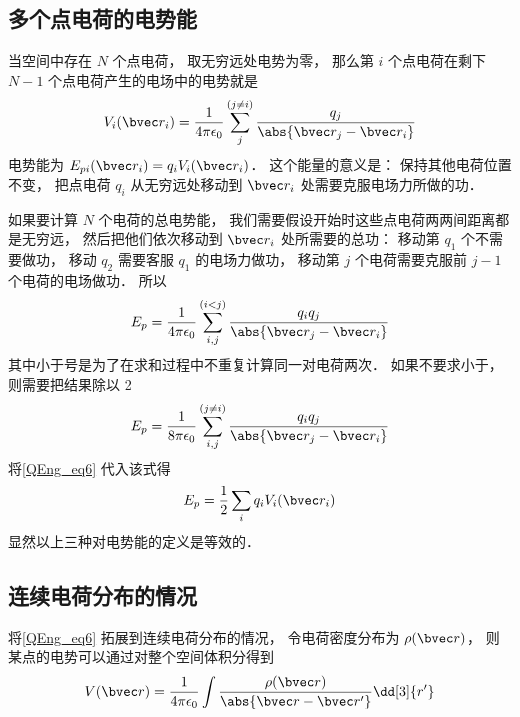 \subsection{多个点电荷的电势能}
 当空间中存在 $N$ 个点电荷， 取无穷远处电势为零， 那么第 $i$ 个点电荷在剩下 $N-1$ 个点电荷产生的电场中的电势就是
\begin{equation}\label{QEng_eq6}
V_i(\bvec r_i) = \frac{1}{4\pi\epsilon_0} \sum_j^{(j\ne i)} \frac{q_j}{\abs{\bvec r_j - \bvec r_i}}
\end{equation}
电势能为 $E_{pi}(\bvec r_i) = q_i V_i(\bvec r_i)$． 这个能量的意义是： 保持其他电荷位置不变， 把点电荷 $q_i$ 从无穷远处移动到 $\bvec r_i$ 处需要克服电场力所做的功．

如果要计算 $N$ 个电荷的总电势能， 我们需要假设开始时这些点电荷两两间距离都是无穷远， 然后把他们依次移动到 $\bvec r_i$ 处所需要的总功： 移动第 $q_1$ 个不需要做功， 移动 $q_2$ 需要客服 $q_1$ 的电场力做功， 移动第 $j$ 个电荷需要克服前 $j-1$ 个电荷的电场做功． 所以
\begin{equation}\label{QEng_eq10}
E_p = \frac{1}{4\pi\epsilon_0} \sum_{i,j}^{(i < j)} \frac{q_i q_j}{\abs{\bvec r_j - \bvec r_i}}
\end{equation}
其中小于号是为了在求和过程中不重复计算同一对电荷两次． 如果不要求小于， 则需要把结果除以 2
\begin{equation}
E_p = \frac{1}{8\pi\epsilon_0} \sum_{i, j}^{(j\neq i)} \frac{q_i q_j}{\abs{\bvec r_j - \bvec r_i}}
\end{equation}
将\autoref{QEng_eq6} 代入该式得
\begin{equation}\label{QEng_eq7}
E_p = \frac12 \sum_i q_i V_i(\bvec r_i)
\end{equation}
显然以上三种对电势能的定义是等效的．

\subsection{连续电荷分布的情况}
将\autoref{QEng_eq6} 拓展到连续电荷分布的情况， 令电荷密度分布为 $\rho(\bvec r)$， 则某点的电势可以通过对整个空间体积分得到
\begin{equation}\label{QEng_eq11}
V(\bvec r) = \frac{1}{4\pi\epsilon_0} \int \frac{\rho(\bvec r)}{\abs{\bvec r - \bvec r'}} \dd[3]{r'}
\end{equation}


